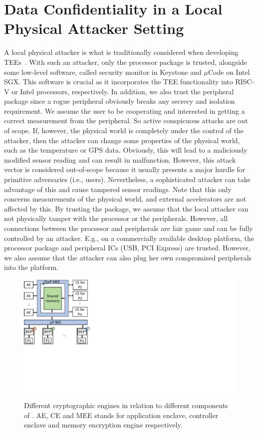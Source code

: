
\section{Data Confidentiality in a Local Physical Attacker Setting}
\label{pie:sec:localAttacker}


A local physical attacker is what is traditionally considered when developing TEEs~\cite{costan2016intel,keystone}. With such an attacker, only the processor package is trusted, alongside some low-level software, called security monitor in Keystone and $\mu$Code on Intel SGX. This software is crucial as it incorporates the TEE functionality into RISC-V or Intel processors, respectively. In addition, we also trust the peripheral package since a rogue peripheral obviously breaks any secrecy and isolation requirement. We assume the user to be cooperating and interested in getting a correct measurement from the peripheral. So active conspicuous attacks are out of scope.  If, however, the physical world is completely under the control of the attacker, then the attacker can change some properties of the physical world, such as the temperature or GPS data. Obviously, this will lead to a maliciously modified sensor reading and can result in malfunction. However, this attack vector is considered out-of-scope because it usually presents a major hurdle for primitive adversaries (i.e., users). Nevertheless, a sophisticated attacker can take advantage of this and cause tampered sensor readings. Note that this only concerns measurements of the physical world, and external accelerators are not affected by this. By trusting the package, we assume that the local attacker can not physically tamper with the processor or the peripherals. However, all connections between the processor and peripherals are fair game and can be fully controlled by an attacker. E.g., on a commercially available desktop platform, the processor package and peripheral ICs (USB, PCI Express) are trusted. However, we also assume that the attacker can also plug her own compromised peripherals into the platform. 



  \begin{figure}[tbp]
   \centering
   \includegraphics[trim={0 8.5cm 23cm 0}, clip, width=0.5\linewidth]{chapters/PIE/images/memoryEnc.pdf}
   \caption[Different cryptographic engines in \name]{Different cryptographic engines in relation to different components of \name. AE, CE and MEE stands for application enclave, controller enclave and memory encryption engine respectively.}
   \label{fig:encEngine}
  \end{figure}

